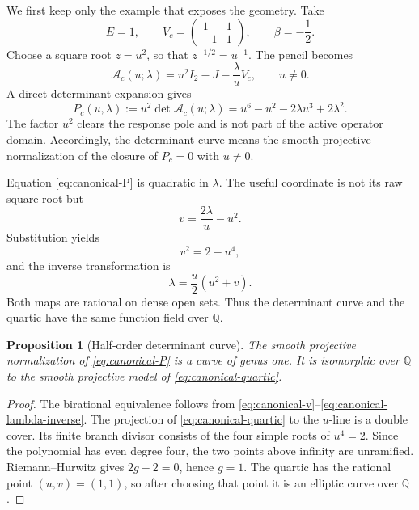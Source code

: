 \documentclass[11pt,reqno]{amsart}
\newtheorem{proposition}[theorem]{Proposition}
\theoremstyle{remark}
\newcommand{\Q}{\mathbb Q}
\newcommand{\cA}{\mathcal A}
\begin{document}
We first keep only the example that exposes the geometry.  Take
\begin{equation}\label{eq:canonical-data}
 E=1,\qquad
 V_c=\begin{pmatrix}1&1\\-1&1\end{pmatrix},
 \qquad \beta=-\frac12.
\end{equation}
Choose a square root $z=u^2$, so that $z^{-1/2}=u^{-1}$.  The pencil becomes
\begin{equation}\label{eq:canonical-pencil}
 \cA_c(u;\lambda)
 =u^2I_2-J-\frac{\lambda}{u}V_c,\qquad u\ne0.
\end{equation}
A direct determinant expansion gives
\begin{equation}\label{eq:canonical-P}
 P_c(u,\lambda):=u^2\det\cA_c(u;\lambda)
 =u^6-u^2-2\lambda u^3+2\lambda^2.
\end{equation}
The factor $u^2$ clears the response pole and is not part of the active
operator domain.  Accordingly, the determinant curve means the smooth
projective normalization of the closure of $P_c=0$ with $u\ne0$.

Equation \eqref{eq:canonical-P} is quadratic in $\lambda$.  The useful
coordinate is not its raw square root but
\begin{equation}\label{eq:canonical-v}
 v=\frac{2\lambda}{u}-u^2.
\end{equation}
Substitution yields
\begin{equation}\label{eq:canonical-quartic}
 v^2=2-u^4,
\end{equation}
and the inverse transformation is
\begin{equation}\label{eq:canonical-lambda-inverse}
 \lambda=\frac{u}{2}(u^2+v).
\end{equation}
Both maps are rational on dense open sets.  Thus the determinant curve and
the quartic have the same function field over $\Q$.

\begin{proposition}[Half-order determinant curve]\label{prop:half-order-elliptic}
The smooth projective normalization of \eqref{eq:canonical-P} is a curve of
genus one.  It is isomorphic over $\Q$ to the smooth projective model of
\eqref{eq:canonical-quartic}.
\end{proposition}

\begin{proof}
The birational equivalence follows from
\eqref{eq:canonical-v}--\eqref{eq:canonical-lambda-inverse}.  The projection
of \eqref{eq:canonical-quartic} to the $u$-line is a double cover.  Its finite
branch divisor consists of the four simple roots of $u^4=2$.  Since the
polynomial has even degree four, the two points above infinity are
unramified.  Riemann--Hurwitz gives $2g-2=0$, hence $g=1$.  The quartic has the rational point $(u,v)=(1,1)$, so after
choosing that point it is an elliptic curve over $\Q$.
\end{proof}
\end{document}
